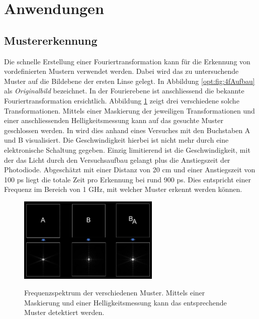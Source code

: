 %
%
%
%
\section{Anwendungen
  \label{opt:section:anwendungen}}

\subsection{Mustererkennung}
Die schnelle Erstellung einer Fouriertransformation kann für die Erkennung von vordefinierten Mustern verwendet werden.
Dabei wird das zu untersuchende Muster auf die Bildebene der ersten Linse gelegt. 
In Abbildung \ref{opt:fig:4fAufbau} als \emph{Originalbild} bezeichnet.
In der Fourierebene ist anschliessend die bekannte Fouriertransformation ersichtlich.
Abbildung \ref{opt:fig:patternYT} zeigt drei verschiedene solche Transformationen.
Mittels einer Maskierung der jeweiligen Transformationen und einer anschliessenden Helligkeitsmessung kann auf das gesuchte Muster geschlossen werden.
In \cite{opt:YT:PatternRecognition} wird dies anhand eines Versuches mit den Buchstaben A und B visualisiert.
Die Geschwindigkeit hierbei ist nicht mehr durch eine elektronische Schaltung gegeben.
Einzig limitierend ist die Geschwindigkeit, mit der das Licht durch den Versuchsaufbau gelangt plus die Anstiegszeit der Photodiode.
Abgeschätzt mit einer Distanz von 20 cm und einer Anstiegszeit von 100 ps liegt die totale Zeit pro Erkennung bei rund 900 ps.
Dies entspricht einer Frequenz im Bereich von 1 GHz, mit welcher Muster erkennt werden können.

\begin{figure}
    \centering
    \includegraphics[width=0.6\textwidth]{papers/opt/images/pattern_YT.png}
    \label{opt:fig:patternYT}
    \caption{Frequenzspektrum der verschiedenen Muster. 
    Mittels einer Maskierung und einer Helligkeitsmessung kann das entsprechende Muster detektiert werden.}
\end{figure}

